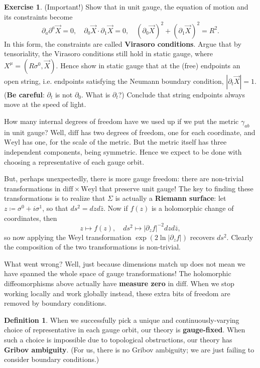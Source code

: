 \documentclass{report}
\theoremstyle{plain}
\theoremstyle{definition}
\newtheorem{definition}[theorem]{Definition}
\newtheorem{exercise}{Exercise}[section]
\theoremstyle{remark}
\newcommand{\di}{\partial}
\newcommand{\diff}{\mathrm{diff}}
\newcommand{\Weyl}{\mathrm{Weyl}}
\begin{document}
\begin{exercise} (Important!)
  Show that in unit gauge, the equation of motion and its
  constraints become
  \[ \di_a \di^a \vec{X} = 0, \quad \di_0\vec{X} \cdot \di_1\vec{X} = 0, \quad (\di_0\vec{X})^2 + (\di_1\vec{X})^2 = R^2. \]
  In this form, the constraints are called {\bf Virasoro conditions}.
  Argue that by tensoriality, the Virasoro conditions still hold in
  static gauge, where $X^\mu = (R\sigma^0, \vec{X})$. Hence show in
  static gauge that at the (free) endpoints an open string, i.e.
  endpoints satisfying the Neumann boundary condition, $|\di_t\vec{X}|
  = 1$. ({\bf Be careful}: $\di_t$ is not $\di_0$. What is $\di_t$?)
  Conclude that string endpoints always move at the speed of light.
\end{exercise}

How many internal degrees of freedom have we used up if we put the
metric $\gamma_{ab}$ in unit gauge? Well, $\diff$ has two degrees of
freedom, one for each coordinate, and $\Weyl$ has one, for the scale
of the metric. But the metric itself has three independent components,
being symmetric. Hence we expect to be done with choosing a
representative of each gauge orbit.

But, perhaps unexpectedly, there is more gauge freedom: there are
non-trivial transformations in $\diff \times \Weyl$ that preserve unit
gauge! The key to finding these transformations is to realize that
$\Sigma$ is actually a {\bf Riemann surface}: let $z \coloneqq
\sigma^0 + i\sigma^1$, so that $ds^2 = dz d\bar{z}$. Now if $f(z)$ is
a holomorphic change of coordinates, then
\[ z \mapsto f(z), \quad ds^2 \mapsto |\di_z f|^{-2} dz d\bar{z}, \]
so now applying the Weyl transformation $\exp(2 \ln |\di_z f|)$
recovers $ds^2$. Clearly the composition of the two transformations is
non-trivial.

What went wrong? Well, just because dimensions match up does not mean
we have spanned the whole space of gauge transformations! The
holomorphic diffeomorphisms above actually have {\bf measure zero} in
$\diff$. When we stop working locally and work globally instead, these
extra bits of freedom are removed by boundary conditions.

\begin{definition}
  When we successfully pick a unique and continuously-varying choice
  of representative in each gauge orbit, our theory is {\bf
    gauge-fixed}. When such a choice is impossible due to topological
  obstructions, our theory has {\bf Gribov ambiguity}. (For us, there
  is no Gribov ambiguity; we are just failing to consider boundary
  conditions.)
\end{definition}
\end{document}
